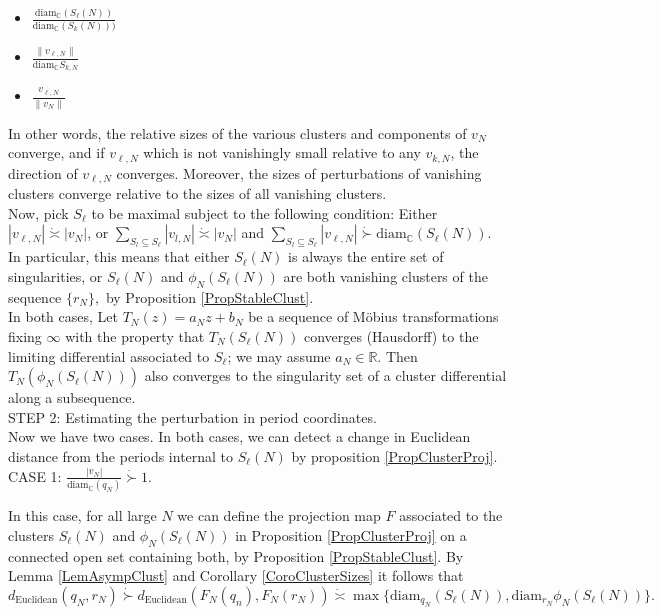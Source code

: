 \documentclass[12pt]{article}
\newcommand{\rr}{\mathbb{R}}
\newcommand{\cc}{\mathbb{C}}
\newcommand{\diam}{\mathrm{diam}}
\begin{document}
\begin{itemize}
\item $\frac{\diam_\cc(S_{\ell}(N))}{\diam_\cc(S_k(N)))}$
\item $\frac{\|v_{\ell,N}\|}{\diam_\cc S_{k,N}}$
\item $\frac{v_{\ell,N}}{\|v_N\|}$
\end{itemize}

\noindent In other words, the relative sizes of the various clusters and components of $v_N$ converge, and if $v_{\ell,N}$ which is not vanishingly small relative to any $v_{k,N}$, the direction of $v_{\ell,N}$ converges. Moreover, the sizes of perturbations of vanishing clusters converge relative to the sizes of all vanishing clusters.\\

\noindent Now, pick $S_\ell$ to be maximal subject to the following condition: Either $|v_{\ell,N}| \dot{\asymp} |v_N|$, or $\sum\limits_{S_l \subseteq S_\ell} |v_{l,N}| \dot{\asymp} |v_N|$ and $\sum\limits_{S_l \subseteq S_\ell} |v_{\ell,N}| \dot{\succ} \diam_\cc(S_{\ell}(N)).$\\

\noindent In particular, this means that either $S_\ell(N)$ is always the entire set of singularities, or $S_\ell(N)$ and $\phi_N(S_\ell(N))$ are both vanishing clusters of the sequence $\{r_N\},$ by Proposition \ref{PropStableClust}.\\

\noindent In both cases, Let $T_N(z) = a_N z + b_N$ be a sequence of M\"obius transformations fixing $\infty$ with the property that $T_N(S_\ell(N))$ converges (Hausdorff) to the limiting differential associated to $S_\ell$; we may assume $a_N \in \rr$. Then $T_N(\phi_N(S_\ell(N)))$ also converges to the singularity set of a cluster differential along a subsequence.\\

\noindent STEP 2: Estimating the perturbation in period coordinates.\\

\noindent Now we have two cases. In both cases, we can detect a change in Euclidean distance from the periods internal to $S_\ell(N)$ by proposition \ref{PropClusterProj}.\\

\noindent CASE 1: $\frac{|v_N|}{\diam_\cc(q_N)} \dot{\succ} 1.$

\noindent In this case, for all large $N$ we can define the projection map $F$ associated to the clusters $S_\ell(N)$ and $\phi_N(S_\ell(N))$ in Proposition \ref{PropClusterProj} on a connected open set containing both, by Proposition \ref{PropStableClust}. By Lemma \ref{LemAsympClust} and Corollary \ref{CoroClusterSizes} it follows that $$d_\mathrm{Euclidean}(q_N,r_N) \dot{\succ} d_\mathrm{Euclidean}(F_N(q_n),F_N(r_N)) \dot{\asymp} \max\{\diam_{q_N}(S_\ell(N)),\diam_{r_N}\phi_N(S_\ell(N))\}.$$
\end{document}
